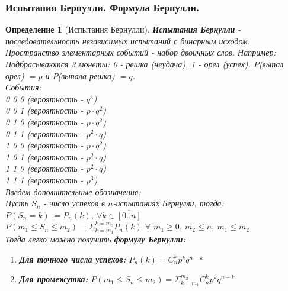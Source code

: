 \documentclass[14pt]{extarticle}
\theoremstyle{breakstyle}
\newtheorem{definition}{Определение}[subsection]
\begin{document}
\subsubsection{Испытания Бернулли. Формула Бернулли.}
\begin{definition}[Испытания Бернулли]

\textbf{Испытания Бернулли} - последовательность независимых испытаний с бинарным исходом. \\

Пространство элементарных событий - набор двоичных слов. Например: \\
Подбрасываются 3 монеты: 0 - решка (неудача), 1 - орел (успех). $P$(выпал орел) $= p$ и $P$(выпала решка) $= q$.\\

События: \\
0 0 0 (вероятность - $q^{3}$)\\
0 0 1 (вероятность - $p \cdot q^{2}$)\\
0 1 0 (вероятность - $p \cdot q^{2}$)\\
0 1 1 (вероятность - $p^{2} \cdot q$)\\
1 0 0 (вероятность - $p \cdot q^{2}$)\\
1 0 1 (вероятность - $p^{2} \cdot q$)\\
1 1 0 (вероятность - $p^{2} \cdot q$)\\
1 1 1 (вероятность - $p^{3}$)\\

Введем дополнительные обозначения: \\
Пусть $S_{n}$ - число успехов в $n$-испытаниях Бернулли, тогда: \\
$P(S_{n} = k) := P_{n}(k)$, $\forall k \in \overline{[0..n]}$ \\
$P(m_{1} \leq S_{n} \leq m_{2}) = \Sigma_{k=m_{1}}^{k=m_{2}}P_{n}(k)$ $\forall$ $m_{1} \geq 0$, $m_{2} \leq n$, $m_{1} \leq m_{2}$ \\

Тогда легко можно получить \textbf{формулу Бернулли:} 
\begin{enumerate}
    \item \textbf{Для точного числа успехов:} $P_{n}(k) = C_{n}^{k}p^{k}q^{n-k}$
    \item \textbf{Для промежутка:} $P(m_{1} \leq S_{n} \leq m_{2}) = \Sigma_{k=m_{1}}^{m_{2}}C_{n}^{k}p^{k}q^{n-k}$
\end{enumerate}

\end{definition}
\end{document}
